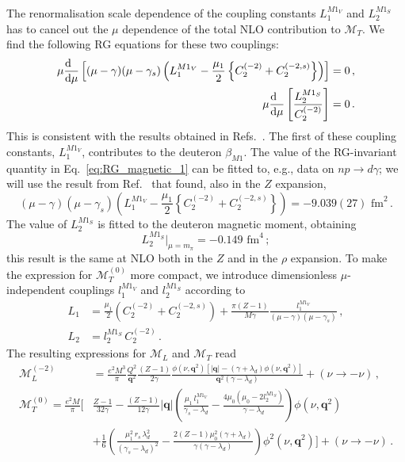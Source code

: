 \documentclass[prl,
twocolumn,
showpacs,preprintnumbers,amsmath,amssymb,
superscriptaddress,
a4paper,nofootinbib,longbibliography]{revtex4-2}
\def\bv#1{\boldsymbol{#1}}
\begin{document}
The renormalisation scale dependence of the coupling constants $L_1^{M1_V}$ and $L_2^{M1_S}$ has to cancel out the $\mu$ dependence of the total NLO contribution to $\mathcal{M}_{T}$. We find the following RG equations for these two couplings:
\begin{align}
\mu\frac{\mathrm{d}\hphantom{\mu}}{\mathrm{d}\mu}\left[(\mu-\gamma)(\mu-\gamma_s)\left(L_1^{M1_V}-\frac{\mu_1}{2}\left\{C_2^{(-2)}+C_2^{(-2,s)}\right\}\right)\right] & = 0\,,
\label{eq:RG_magnetic_1}
\\
\mu\frac{\mathrm{d}\hphantom{\mu}}{\mathrm{d}\mu}\left[\frac{L_2^{M1_S}}{C_2^{(-2)}}\right] & = 0\,.
\label{eq:RG_magnetic_2}
\end{align}
This is consistent with the results obtained in Refs.~\cite{Chen:1999bg,Rupak:1999rk,Ji:2003ia}. The first of these coupling constants, $L_1^{M1_V}$, contributes to the deuteron $\beta_{M1}$. The value of the RG-invariant quantity in Eq.~\eqref{eq:RG_magnetic_1} can be fitted to, e.g., data on $np\to d\gamma$; we will use the result from Ref.~\cite{Rupak:1999rk} that found, also in the $Z$ expansion,
\begin{equation}
(\mu-\gamma)(\mu-\gamma_s)\left(L_1^{M1_V}-\frac{\mu_1}{2}\left\{C_2^{(-2)}+C_2^{(-2,s)}\right\}\right) =-9.039(27)\text{ fm}^2\,.
\label{eq:L1M_value}
\end{equation}
The value of $L_2^{M1_S}$ is fitted to the deuteron magnetic moment, obtaining~\cite{Kaplan:1998sz,Chen:1999tn}
\begin{equation}
L_2^{M1_S}\Big|_{\mu=m_\pi}=-0.149\text{ fm}^4\,;
\label{eq:L2M_value}
\end{equation}
this result is the same  at NLO both in the $Z$ and in the $\rho$ expansion.
To make the expression for $\mathcal{M}_T^{(0)}$ more compact, we introduce dimensionless $\mu$-independent couplings $l_1^{M1_V}$ and $l_2^{M1_S}$ according to
\begin{align}
L_1 & = \frac{\mu_1}{2}\left(C_2^{(-2)}+C_2^{(-2,s)}\right)+\frac{\pi (Z-1)}{M\gamma}\frac{l_1^{M1_V}}{(\mu-\gamma)(\mu-\gamma_s)}\,,\\
L_2 & = l_2^{M1_S}\, C_2^{(-2)}\,.
\end{align}
The resulting expressions for $\mathcal{M}_L$ and $\mathcal{M}_T$ read
\begin{align}
    \mathcal{M}_L^{(-2)} & =\frac{e^2 M^3}{\pi}\frac{Q^2}{\bv{q}^2} \frac{(Z-1)}{2\gamma}\frac{ \phi(\nu,\bv{q}^2) \left[|\bv{q}|-(\gamma +\lambda_d) \phi(\nu,\bv{q}^2)\right]}{ \bv{q}^2 (\gamma -\lambda_d)}+(\nu\to-\nu)\,,\\
    \mathcal{M}_T^{(0)}  = \frac{e^2 M}{\pi}\Bigg[&
    \frac{Z-1}{32 \gamma }
    -\frac{(Z-1)}{12\gamma}|\bv{q}|
    \left(
    \frac{\mu_1\,l_1^{M1_V} }{\gamma_s-\lambda_d}-\frac{4 \mu_0(\mu_0-2l_2^{M1_S})}{\gamma-\lambda_d}
    \right)\phi(\nu,\bv{q}^2)\nonumber\\
    &+\frac{1}{6} 
    \left(
    \frac{ \mu_1^2\, r_s\,\lambda_d^2}{(\gamma_s-\lambda_d)^2}-\frac{2 (Z-1) \mu_0^2 (\gamma +\lambda_d)}{\gamma  (\gamma -\lambda_d)}
    \right)\phi^2(\nu,\bv{q}^2)
   \Bigg]+(\nu\to-\nu)\,.
\end{align}
\end{document}
